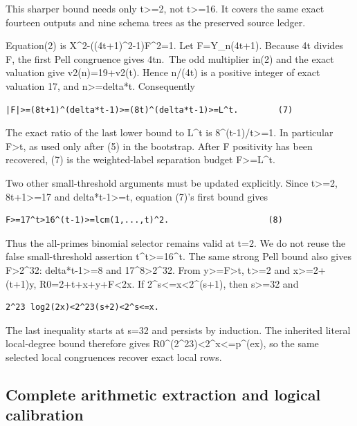 This sharper bound needs only t\textgreater=2, not t\textgreater=16. It
covers the same exact fourteen outputs and nine schema trees as the
preserved source ledger.

Equation(2) is X\^{}2-((4t+1)\^{}2-1)F\^{}2=1. Let
\textbar F\textbar=Y\_n(4t+1). Because 4t divides F, the first Pell
congruence gives 4t\textbar n.~The odd multiplier in(2) and the exact
valuation give v2(n)=19+v2(t). Hence n/(4t) is a positive integer of
exact valuation 17, and n\textgreater=delta*t. Consequently

\begin{verbatim}
|F|>=(8t+1)^(delta*t-1)>=(8t)^(delta*t-1)>=L^t.        (7)
\end{verbatim}

The exact ratio of the last lower bound to L\^{}t is
8\^{}(t-1)/t\textgreater=1. In particular
\textbar F\textbar\textgreater t, as used only after (5) in the
bootstrap. After F positivity has been recovered, (7) is the
weighted-label separation budget F\textgreater=L\^{}t.

Two other small-threshold arguments must be updated explicitly. Since
t\textgreater=2, 8t+1\textgreater=17 and delta*t-1\textgreater=t,
equation (7)'s first bound gives

\begin{verbatim}
F>=17^t>16^(t-1)>=lcm(1,...,t)^2.                    (8)
\end{verbatim}

Thus the all-primes binomial selector remains valid at t=2. We do not
reuse the false small-threshold assertion t\^{}t\textgreater=16\^{}t.
The same strong Pell bound also gives F\textgreater2\^{}32:
delta*t-1\textgreater=8 and 17\^{}8\textgreater2\^{}32. From
y\textgreater=F\textgreater t, t\textgreater=2 and
x\textgreater=2+(t+1)y, R0=2+t+x+y+F\textless2x. If
2\^{}s\textless=x\textless2\^{}(s+1), then s\textgreater=32 and

\begin{verbatim}
2^23 log2(2x)<2^23(s+2)<2^s<=x.
\end{verbatim}

The last inequality starts at s=32 and persists by induction. The
inherited literal local-degree bound therefore gives
R0\^{}(2\^{}23)\textless2\^{}x\textless=p\^{}(ex), so the same selected
local congruences recover exact local rows.

\subsection{Complete arithmetic extraction and logical
calibration}\label{complete-arithmetic-extraction-and-logical-calibration}

